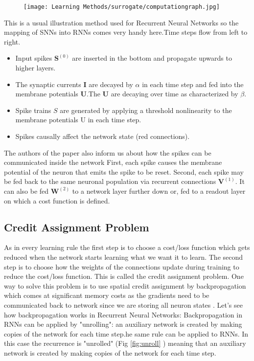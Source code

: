 \documentclass[12pt]{report}
\begin{document}
\begin{figure}[htp]
    \centering
    \texttt{[image: Learning Methods/surrogate/computationgraph.jpg]}
    \caption{}
    \label{fig:computationgraph}
\end{figure}
This is a usual illustration method used for Recurrent Neural Networks so the mapping of SNNs into RNNs comes very handy here.Time steps flow from left to right.
\begin{itemize}
    \item Input spikes $\mathbf{S}^{(0)}$ are inserted in the bottom and propagate upwards to higher layers.
    \item The synaptic currents $\mathbf{I}$ are decayed by $\alpha$ in each time step and fed into the membrane potentials $\mathbf{U}$.The $\mathbf{U}$ are decaying over time as characterized by $\beta .$
    \item Spike trains $S$ are generated by applying a threshold nonlinearity to the membrane potentials $\mathrm{U}$ in each time step.
    \item  Spikes causally affect the network state (red connections).
    
\end{itemize}
The authors of the paper also inform us about how the spikes can be communicated inside the network
First, each spike causes the membrane potential of the neuron that emits the spike to be reset. Second, each spike may be fed back to the same neuronal population via recurrent connections $\mathbf{V}^{(1)}$. It can also be fed $\mathbf{W}^{(2)}$ to a network layer further down or, fed to a readout layer on which a cost function is defined.
\subsection{Credit Assignment Problem}
As in every learning rule the first step is to choose a cost/loss function which gets reduced when the network starts learning what we want it to learn. The second step is to choose how the weights of the connections update during training to reduce the cost/loss function. This is called the credit assignment problem. One way to solve this problem is to use spatial credit assignment by backpropagation which comes at significant memory costs as the gradients need to be communicated back to network since we are storing all neuron states . Let's see how backpropagation works in Recurrent Neural Networks:
Backpropagation in RNNs can be applied by "unrolling": an auxiliary network is created by making copies of the network for each time step.he same rule can be applied to RNNs. In this case the recurrence is "unrolled" (Fig \ref{fig:unroll} ) meaning that an auxiliary network is created by making copies of the network for each time step.
\end{document}
